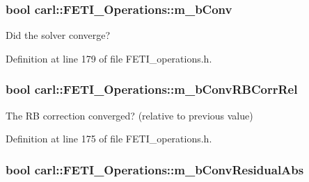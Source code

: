 \subsubsection[{m\+\_\+b\+Conv}]{\setlength{\rightskip}{0pt plus 5cm}bool carl\+::\+F\+E\+T\+I\+\_\+\+Operations\+::m\+\_\+b\+Conv\hspace{0.3cm}{\ttfamily [protected]}}\label{classcarl_1_1_f_e_t_i___operations_a4e8e38670cc41dc8de9e9465eda687ba}


Did the solver converge? 



Definition at line 179 of file F\+E\+T\+I\+\_\+operations.\+h.

\hypertarget{classcarl_1_1_f_e_t_i___operations_a324e0a6913e912861b38449fb6c482b5}{}
\subsubsection[{m\+\_\+b\+Conv\+R\+B\+Corr\+Rel}]{\setlength{\rightskip}{0pt plus 5cm}bool carl\+::\+F\+E\+T\+I\+\_\+\+Operations\+::m\+\_\+b\+Conv\+R\+B\+Corr\+Rel\hspace{0.3cm}{\ttfamily [protected]}}\label{classcarl_1_1_f_e_t_i___operations_a324e0a6913e912861b38449fb6c482b5}


The R\+B correction converged? (relative to previous value) 



Definition at line 175 of file F\+E\+T\+I\+\_\+operations.\+h.

\hypertarget{classcarl_1_1_f_e_t_i___operations_a06ed6c8995fd004aabe207d2a961029e}{}
\subsubsection[{m\+\_\+b\+Conv\+Residual\+Abs}]{\setlength{\rightskip}{0pt plus 5cm}bool carl\+::\+F\+E\+T\+I\+\_\+\+Operations\+::m\+\_\+b\+Conv\+Residual\+Abs\hspace{0.3cm}{\ttfamily [protected]}}\label{classcarl_1_1_f_e_t_i___operations_a06ed6c8995fd004aabe207d2a961029e}


